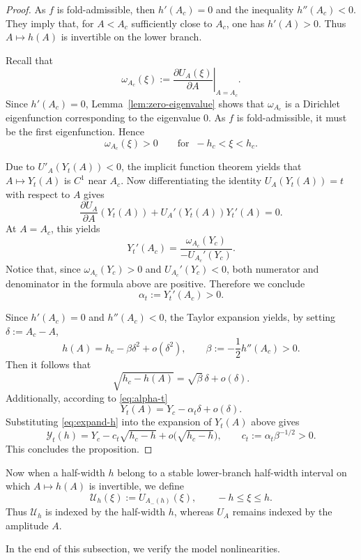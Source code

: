 \documentclass[reqno,12pt]{amsart}
\numberwithin{equation}{section}
\theoremstyle{remark}
\begin{document}
\begin{proof}
As $f$ is fold-admissible, then $h'(A_c)=0$ and the inequality $h''(A_c)<0$. They imply that, for
$A<A_c$ sufficiently close to $A_c$, one has $
h'(A)>0.$
Thus $A\mapsto h(A)$ is invertible on the lower branch.

Recall that 
$$
\omega_{A_c}(\xi):=\left.\frac{\partial U_A(\xi)}{\partial A}\right|_{A=A_c}.
$$
Since $h'(A_c)=0$, Lemma~\ref{lem:zero-eigenvalue} shows that $\omega_{A_c}$ is a
Dirichlet eigenfunction corresponding to the eigenvalue $0$.  As $f$ is
fold-admissible, it must be the first eigenfunction. Hence
$$
\omega_{A_c}(\xi)>0
\qquad\text{for }\ -h_c<\xi<h_c.
$$

Due to $U'_A(Y_t(A))<0$, the implicit function theorem yields that $ A\mapsto Y_t(A)$ is $C^1$ near $A_c$.
Now differentiating the identity
$U_A(Y_t(A))=t$
with respect to $A$ gives
$$
\frac{\partial U_A}{\partial A}(Y_t(A))
+ U_A'(Y_t(A))Y_t'(A)=0.
$$
At $A=A_c$, this yields
$$
Y_t'(A_c)=
\frac{\omega_{A_c}(Y_c)}{-U_{A_c}'(Y_c)}.
$$
Notice that, since $\omega_{A_c}(Y_c)>0$ and
$U_{A_c}'(Y_c)<0$, both numerator and denominator in the formula above are positive. Therefore we conclude
\begin{equation}\label{eq:alpha-t}
    \alpha_t:=Y_t'(A_c)>0.
\end{equation}
 

Since $h'(A_c)=0$ and $h''(A_c)<0$, the Taylor expansion yields, by setting $\delta:=A_c-A$,
$$
h(A)=h_c-\beta\delta^2+o(\delta^2),\qquad \beta:=-\frac12h''(A_c)>0.
$$
Then it follows that 
\begin{equation}\label{eq:expand-h}
    \sqrt{h_c-h(A)}=\sqrt\beta\,\delta+o(\delta).
\end{equation}
Additionally, according to \eqref{eq:alpha-t}
$$
Y_t(A)=Y_c-\alpha_t\delta+o(\delta).
$$
Substituting \eqref{eq:expand-h} into the expansion of $Y_t(A)$ above gives
$$
\mathcal Y_t(h)=Y_c-c_t\sqrt{h_c-h}+o\bigl(\sqrt{h_c-h}\bigr),
\qquad
c_t:=\alpha_t\beta^{-1/2}>0.
$$
This concludes the proposition. 
\end{proof}

Now when a half-width $h$ belong  to a stable lower-branch half-width interval on which $A\mapsto h(A)$ is invertible, we define
$$
   \mathcal U_h(\xi):=U_{A_-(h)}(\xi),\qquad -h\le \xi\le h.
$$
Thus $\mathcal U_h$ is indexed by the half-width $h$, whereas $U_A$ remains indexed by the amplitude $A$.

In the end of this subsection, we verify the model nonlinearities. 
\end{document}
